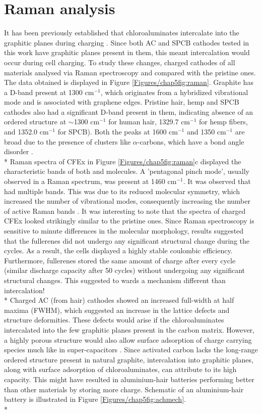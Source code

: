 \section*{Raman analysis}
It has been previously established that chloroaluminates intercalate into the graphitic planes during charging \cite{lin_ultrafast_2015}. Since both AC and SPCB cathodes tested in this work have graphitic planes present in them, this meant intercalation would occur during cell charging. To study these changes, charged cathodes of all materials analysed via Raman spectroscopy and compared with the pristine ones. The data obtained is displayed in Figure \ref{Figures/chap5fig:raman}. Graphite has a D-band present at 1300 cm$^{-1}$, which originates from a hybridized vibrational mode and is associated with graphene edges. Pristine hair, hemp and SPCB cathodes also had a significant D-band present in them, indicating absence of an ordered structure at $\sim$1300 cm$^{-1}$ for human hair, 1329.7 cm$^{-1}$ for hemp fibers, and 1352.0 cm$^{-1}$ for SPCB). Both the peaks at 1600 cm$^{-1}$ and 1350 cm$^{-1}$ are broad due to the presence of  clusters like $\alpha$-carbons, which have a bond angle disorder \cite{shimodaira_raman_2002}.\\*
Raman spectra of CFEx in Figure \ref{Figures/chap5fig:raman}c displayed the characteristic bands of both  and  molecules. A 'pentagonal pinch mode', usually observed in a  Raman spectrum, was present at 1460 cm$^{-1}$. It was observed that  had multiple bands. This was due to its reduced molecular symmetry, which increased the number of vibrational modes, consequently increasing the number of active Raman bands \cite{kimbrell_analysis_2014}. It was interesting to note that the spectra of charged CFEx looked strikingly similar to the pristine ones. Since Raman spectroscopy is sensitive to minute differences in the molecular morphology, results suggested that the fullerenes did not undergo any significant structural change during the cycles. As a result, the cells displayed a highly stable coulombic efficiency. Furthermore, fullerenes stored the same amount of charge after every cycle (similar discharge capacity after 50 cycles) without undergoing any significant structural changes. This suggested to wards a mechanism different than intercalation!\\* 
Charged AC (from hair) cathodes showed an increased full-width at half maxima (FWHM), which suggested an increase in the lattice defects and structure deformities. These defects would arise if the chloroaluminates intercalated into the few graphitic planes present in the carbon matrix. However, a highly porous structure would also allow surface adsorption of charge carrying species much like in super-capacitors \cite{beguin_carbons_2014}. Since activated carbon lacks the long-range ordered structure present in natural graphite, intercalation into graphitic planes, along with surface adsorption of chloroaluminates, can attribute to its high capacity\cite{brezesinski_ordered_2010}. This might have resulted in aluminium-hair batteries performing better than other materials by storing more charge. Schematic of an aluminium-hair battery is illustrated in Figure \ref{Figures/chap5fig:achmech}.\\*
